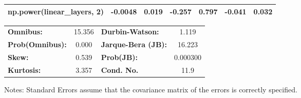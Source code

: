 \begin{center}
\begin{tabular}{lcccccc}
\textbf{np.power(linear\_layers, 2)}      &      -0.0048  &        0.019     &    -0.257  &         0.797        &       -0.041    &        0.032     \\
\bottomrule
\end{tabular}
\begin{tabular}{lclc}
\textbf{Omnibus:}       & 15.356 & \textbf{  Durbin-Watson:     } &    1.119  \\
\textbf{Prob(Omnibus):} &  0.000 & \textbf{  Jarque-Bera (JB):  } &   16.223  \\
\textbf{Skew:}          &  0.539 & \textbf{  Prob(JB):          } & 0.000300  \\
\textbf{Kurtosis:}      &  3.357 & \textbf{  Cond. No.          } &     11.9  \\
\bottomrule
\end{tabular}
\end{center}

Notes: \newline
 [1] Standard Errors assume that the covariance matrix of the errors is correctly specified.
